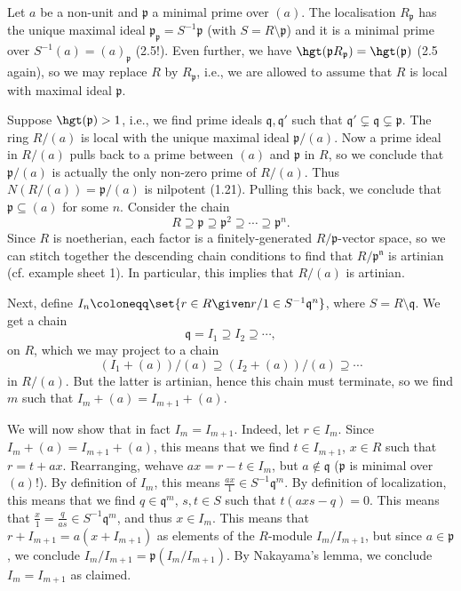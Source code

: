 Let $a$ be a non-unit and $\mathfrak{p}$ a minimal prime over $(a)$. The
localisation $R_{\mathfrak{p}}$ has the unique maximal ideal
$\mathfrak{p}_{\mathfrak{p}} = S^{-1}\mathfrak{p}$ (with $S = R\setminus \mathfrak{p}$)
and it is a minimal prime over $S^{-1}(a) = (a)_{\mathfrak{p}}$ (2.5!). Even
further, we have $\hgt(\mathfrak{p}R_{\mathfrak{p}}) = \hgt(\mathfrak{p})$ (2.5 again),
so we may replace $R$ by $R_{\mathfrak{p}}$, i.e., we are allowed to assume that
$R$ is local with maximal ideal $\mathfrak{p}$.

Suppose $\hgt(\mathfrak{p}) > 1$, i.e., we find prime ideals $\mathfrak{q}, \mathfrak{q}'$
such that $\mathfrak{q}' \subsetneq \mathfrak{q}\subsetneq \mathfrak{p}$. The
ring $R/(a)$ is local with the unique maximal ideal $\mathfrak{p}/(a)$. Now a prime
ideal in $R/(a)$ pulls back to a prime between $(a)$ and $\mathfrak{p}$ in $R$,
so we conclude that $\mathfrak{p}/(a)$ is actually the only non-zero prime of $R/(a)$.
Thus $N(R/(a)) = \mathfrak{p}/(a)$ is nilpotent (1.21). Pulling this back, we conclude
that $\mathfrak{p} \subseteq (a)$ for some $n$.
Consider the chain
\[ R \supseteq \mathfrak{p} \supseteq \mathfrak{p}^2 \supseteq \cdots\supseteq \mathfrak{p}^n. \]
Since $R$ is noetherian, each factor is a finitely-generated $R/\mathfrak{p}$-vector
space, so we can stitch together the descending chain conditions to find that
$R/\mathfrak{p^n}$ is artinian (cf. example sheet 1). In particular, this implies
that $R/(a)$ is artinian.

Next, define $I_n\coloneqq \set{r \in R\given r/1 \in S^{-1}\mathfrak{q}^n}$, where
$S = R\setminus \mathfrak{q}$. We get a chain
\[ \mathfrak{q} = I_1 \supseteq I_2 \supseteq \cdots, \]
on $R$, which we may project to a chain
\[ (I_1 + (a))/(a) \supseteq (I_2 + (a))/(a) \supseteq\cdots \]
in $R/(a)$. But the latter is artinian, hence this chain must terminate, so we find
$m$ such that $I_m + (a) = I_{m+1} + (a)$.

We will now show that in fact $I_m = I_{m+1}$. Indeed, let $r \in I_m$. Since
$I_m + (a) = I_{m+1} + (a)$, this means that we  find $t \in I_{m+1}$, $x \in R$ such
that $r = t+ax$. Rearranging, wehave $ax = r-t \in I_m$, but $a\notin \mathfrak{q}$
($\mathfrak{p}$ is minimal over $(a)$!). By definition of $I_m$, this means
$\frac{ax}{1} \in S^{-1}\mathfrak{q}^m$. By definition of localization, this
means that we find $q \in \mathfrak{q}^m$, $s, t \in S$ such that
$t(axs - q) = 0$. This means that $\frac{x}{1} = \frac{q}{as} \in S^{-1}\mathfrak{q}^m$,
and thus $x \in I_m$. This means that $r + I_{m+1} = a(x + I_{m+1})$ as elements
of the $R$-module $I_m/I_{m+1}$, but since $a \in \mathfrak{p}$, we conclude
$I_m/I_{m+1} = \mathfrak{p}(I_m/I_{m+1})$. By Nakayama's lemma, we conclude
$I_m = I_{m+1}$ as claimed.

